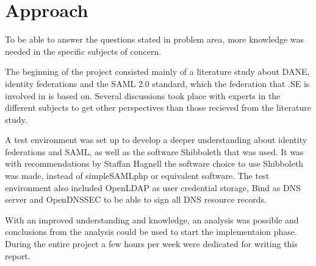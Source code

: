 \section{Approach}

To be able to answer the questions stated in problem area, more knowledge was needed in the specific subjects of concern.

The beginning of the project consisted mainly of a literature study about DANE, identity federations and the SAML 2.0 standard, which the federation that .SE is involved in is based on. 
Several discussions took place with experts in the different subjects to get other perspectives than those recieved from the literature study.

A test environment was set up to develop a deeper understanding about identity federations and SAML, as well as the software 
Shibboleth that was used. 
It was with recommendations by Staffan Hagnell the software choice to use Shibboleth was made, instead of simpleSAMLphp or equivalent software.
The test environment also included OpenLDAP as user credential storage, Bind as DNS server and OpenDNSSEC to be able to sign all DNS resource records.

With an improved understanding and knowledge, an analysis was possible and conclusions from the analysis could be used 
to start the implementaion phase. During the entire project a few hours per week were dedicated for writing this report.



 

